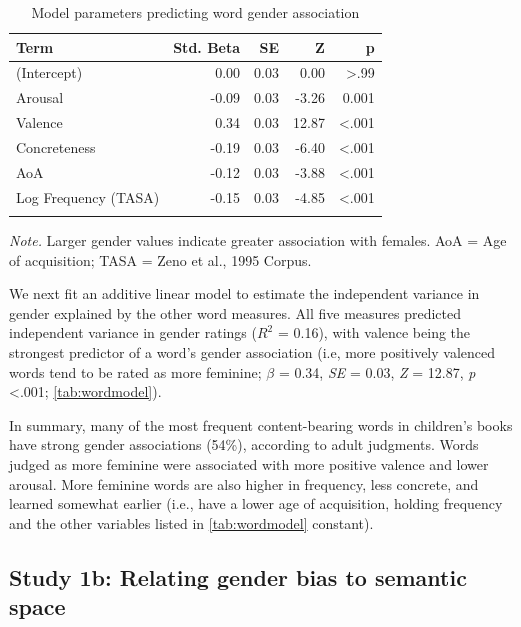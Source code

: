 \documentclass[
  english,
  ,man,floatsintext]{apa6}
\begin{document}
\begin{table}[tbp]
\begin{center}
\begin{threeparttable}
\caption{\label{tab:wordmodel}Model parameters predicting word gender association}
\begin{tabular}{lrrrr}
\toprule
Term & Std. Beta & SE & Z & p\\
\midrule
(Intercept) & 0.00 & 0.03 & 0.00 & >.99\\
Arousal & -0.09 & 0.03 & -3.26 & 0.001\\
Valence & 0.34 & 0.03 & 12.87 & <.001\\
Concreteness & -0.19 & 0.03 & -6.40 & <.001\\
AoA & -0.12 & 0.03 & -3.88 & <.001\\
Log Frequency (TASA) & -0.15 & 0.03 & -4.85 & <.001\\
\bottomrule
\addlinespace
\end{tabular}
\begin{tablenotes}[para]
\normalsize{\textit{Note.} Larger gender values indicate greater association with females. AoA = Age of acquisition;  TASA = Zeno et al., 1995 Corpus.}
\end{tablenotes}
\end{threeparttable}
\end{center}
\end{table}

We next fit an additive linear model to estimate the independent variance in gender explained by the other word measures. All five measures predicted independent variance in gender ratings (\(R^2\) = 0.16), with valence being the strongest predictor of a word's gender association (i.e, more positively valenced words tend to be rated as more feminine; \(\beta\) = 0.34, \emph{SE} = 0.03, \emph{Z} = 12.87, \emph{p} \textless.001; \autoref{tab:wordmodel}).

In summary, many of the most frequent content-bearing words in children's books have strong gender associations (54\%), according to adult judgments. Words judged as more feminine were associated with more positive valence and lower arousal. More feminine words are also higher in frequency, less concrete, and learned somewhat earlier (i.e., have a lower age of acquisition, holding frequency and the other variables listed in \autoref{tab:wordmodel} constant).

\hypertarget{study-1b-relating-gender-bias-to-semantic-space}{%
\subsection{Study 1b: Relating gender bias to semantic space}\label{study-1b-relating-gender-bias-to-semantic-space}}
\end{document}
